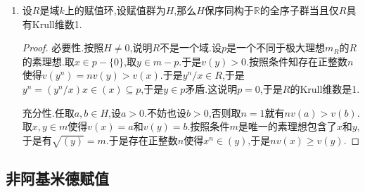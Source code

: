 \begin{enumerate}
\begin{enumerate}[(1)]
\begin{proof}
			验证$\varphi$是保序映射.取$y<y'$,$y,y'\in H$,我们断言$\varphi(y)<\varphi(y')$.事实上,取自然数$r$使得$10^r(y'-y)>2x$,记$n_r$和$n_r'$是整数分别满足$n_rx\le 10^ry<(n_r+1)x$和$n_r'x\le 10^ry'<(n_r'+1)x$.于是有$n_rx\le 10^ry<(n_r+1)x<n_r'x\le 10^ry'<(n_r'+1)x$.于是$\varphi(y)\le\frac{n_r+1}{10^r}<\frac{n_r'}{10^r}\le\varphi(y')$.这得到严格保序,并且推出$\varphi$是单射.
			
			验证$\varphi$是同态.若$y,y'\in H$,分别对应于柯西列$(n_r/10^r)$和$(n_r'/10^r)$.那么有$(n_r+n_r')x\le y+y'<(n_r+n_r'+2)x$.于是如果$(m_r)$是由$y+y'$定义的整数序列,就有$n_r+n_r'\le m_r\le n_r+n_r'+1$,于是$\frac{n_r+n_r'}{10^r}\le\frac{m_r}{10^r}\le\frac{n_r+n_r'+1}{10^r}$,对$r$取极限,得到$\varphi(y)+\varphi(y')=\varphi(y+y')$.
		\end{proof}
		\item 设$R$是域$k$上的赋值环,设赋值群为$H$,那么$H$保序同构于$\mathbb{R}$的全序子群当且仅$R$具有Krull维数1.
		\begin{proof}
			
			必要性.按照$H\not=0$,说明$R$不是一个域.设$p$是一个不同于极大理想$m_R$的$R$的素理想.取$x\in p-\{0\}$,取$y\in m-p$.于是$v(y)>0$.按照条件知存在正整数$n$使得$v(y^n)=nv(y)>v(x)$.于是$y^n/x\in R$,于是$y^n=(y^n/x)x\in(x)\subseteq p$,于是$y\in p$矛盾.这说明$p=0$,于是$R$的Krull维数是1.
			
			充分性.任取$a,b\in H$,设$a>0$.不妨也设$b>0$,否则取$n=1$就有$nv(a)>v(b)$.取$x,y\in m$使得$v(x)=a$和$v(y)=b$.按照条件$m$是唯一的素理想包含了$x$和$y$,于是有$\sqrt{(y)}=m$.于是存在正整数$n$使得$x^n\in(y)$,于是$nv(x)\ge v(y)$.
		\end{proof}
	\end{enumerate}
\end{enumerate}
\subsection{非阿基米德赋值}

